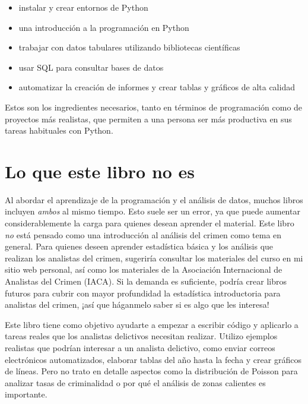 \documentclass[
  letterpaper,
]{scrbook}
\providecommand{\tightlist}{%
  \setlength{\itemsep}{0pt}\setlength{\parskip}{0pt}}\usepackage{longtable,booktabs,array}
\begin{document}
\begin{itemize}
\tightlist
\item
  instalar y crear entornos de Python
\item
  una introducción a la programación en Python
\item
  trabajar con datos tabulares utilizando bibliotecas científicas
\item
  usar SQL para consultar bases de datos
\item
  automatizar la creación de informes y crear tablas y gráficos de alta
  calidad
\end{itemize}

Estos son los ingredientes necesarios, tanto en términos de programación
como de proyectos más realistas, que permiten a una persona ser más
productiva en sus tareas habituales con Python.

\section*{Lo que este libro no es}\label{lo-que-este-libro-no-es}


Al abordar el aprendizaje de la programación y el análisis de datos,
muchos libros incluyen \emph{ambos} al mismo tiempo. Esto suele ser un
error, ya que puede aumentar considerablemente la carga para quienes
desean aprender el material. Este libro \emph{no} está pensado como una
introducción al análisis del crimen como tema en general. Para quienes
deseen aprender estadística básica y los análisis que realizan los
analistas del crimen, sugeriría consultar los materiales del curso en mi
sitio web personal, así como los materiales de la Asociación
Internacional de Analistas del Crimen (IACA). Si la demanda es
suficiente, podría crear libros futuros para cubrir con mayor
profundidad la estadística introductoria para analistas del crimen, ¡así
que háganmelo saber si es algo que les interesa!

Este libro tiene como objetivo ayudarte a empezar a escribir código y
aplicarlo a tareas reales que los analistas delictivos necesitan
realizar. Utilizo ejemplos realistas que podrían interesar a un analista
delictivo, como enviar correos electrónicos automatizados, elaborar
tablas del año hasta la fecha y crear gráficos de líneas. Pero no trato
en detalle aspectos como la distribución de Poisson para analizar tasas
de criminalidad o por qué el análisis de zonas calientes es importante.
\end{document}
